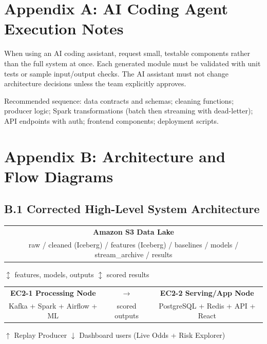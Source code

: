 \documentclass[11pt,a4paper]{article}
\begin{document}
\appendix
\section*{Appendix A: AI Coding Agent Execution Notes}

When using an AI coding assistant, request small, testable components rather than the full system
at once. Each generated module must be validated with unit tests or sample input/output checks.
The AI assistant must not change architecture decisions unless the team explicitly approves.

Recommended sequence: data contracts and schemas; cleaning functions; producer logic; Spark
transformations (batch then streaming with dead-letter); API endpoints with auth; frontend
components; deployment scripts.

\section*{Appendix B: Architecture and Flow Diagrams}

\subsection*{B.1 Corrected High-Level System Architecture}

\begin{center}
\begin{tabular}{|c|}
\hline
\textbf{Amazon S3 Data Lake}\\
raw / cleaned (Iceberg) / features (Iceberg) / baselines / models / stream\_archive / results\\
\hline
\end{tabular}

\vspace{6pt}
$\updownarrow$ features, models, outputs \hspace{2cm} $\updownarrow$ scored results

\vspace{6pt}
\begin{tabular}{|c|c|c|}
\hline
\textbf{EC2-1 Processing Node} & $\longrightarrow$ & \textbf{EC2-2 Serving/App Node}\\
Kafka + Spark + Airflow + ML & scored outputs & PostgreSQL + Redis + API + React\\
\hline
\end{tabular}

\vspace{6pt}
$\uparrow$ Replay Producer \hspace{4cm} $\downarrow$ Dashboard users (Live Odds + Risk Explorer)
\end{center}
\end{document}
